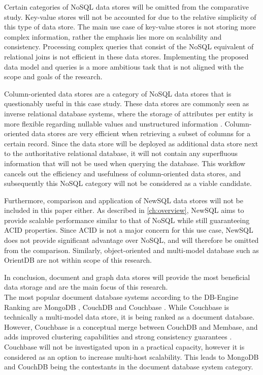 Certain categories of NoSQL data stores will be omitted from the comparative study.
Key-value stores will not be accounted for due to the relative simplicity of this type of data store.
The main use case of key-value stores is not storing more complex information, rather the emphasis lies more on scalability and consistency.
Processing complex queries that consist of the NoSQL equivalent of relational joins is not efficient in these data stores.
Implementing the proposed data model and queries is a more ambitious task that is not aligned with the scope and goals of the research.

Column-oriented data stores are a category of NoSQL data stores that is questionably useful in this case study.
These data stores are commonly seen as inverse relational database systems, where the storage of attributes per entity is more flexible regarding nullable values and unstructured information \autocite{Abadi2009}.
Column-oriented data stores are very efficient when retrieving a subset of columns for a certain record.
Since the data store will be deployed as additional data store next to the authoritative relational database, it will not contain any superfluous information that will not be used when querying the database.
This workflow cancels out the efficiency and usefulness of column-oriented data stores, and subsequently this NoSQL category will not be considered as a viable candidate.

Furthermore, comparison and application of NewSQL data stores will not be included in this paper either.
As described in \cref{ch:overview}, NewSQL aims to provide scalable performance similar to that of NoSQL while still guaranteeing ACID properties.
Since ACID is not a major concern for this use case, NewSQL does not provide significant advantage over NoSQL, and will therefore be omitted from the comparison.
Similarly, object-oriented and multi-model database such as OrientDB \autocite{OrientDB2010} are not within scope of this research.

In conclusion, document and graph data stores will provide the most beneficial data storage and are the main focus of this research.\\

The most popular document database systems according to the DB-Engine Ranking are MongoDB \autocite{MongoDB2009}, CouchDB \autocite{CouchDB2005} and Couchbase \autocite{Couchbase2010}.
While Couchbase is technically a multi-model data store, it is being ranked as a document database.
However, Couchbase is a conceptual merge between CouchDB and Membase, and adds improved clustering capabilities and strong consistency guarantees \autocite{Couchbase2018}.
Couchbase will not be investigated upon in a practical capacity, however it is considered as an option to increase multi-host scalability.
This leads to MongoDB and CouchDB being the contestants in the document database system category.

